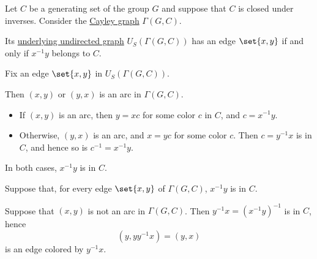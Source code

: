\begin{proposition}\label{thm:undirected_cayley_graph}
  Let \( C \) be a generating set of the group \( G \) and suppose that \( C \) is closed under inverses. Consider the \hyperref[def:cayley_graph]{Cayley graph} \( \Gamma(G, C) \).

  Its \hyperref[def:multigraph_orientation]{underlying undirected graph} \hyperref[def:graph_functors/simple_forgetful]{\( U_S \)}\( (\Gamma(G, C)) \) has an edge \( \set{ x, y } \) if and only if \( x^{-1} y \) belongs to \( C \).
\end{proposition}
\begin{defproof}
  \SufficiencySubProof Fix an edge \( \set{ x, y } \) in \( U_S(\Gamma(G, C)) \).

  Then \( (x, y) \) or \( (y, x) \) is an arc in \( \Gamma(G, C) \).

  \begin{itemize}
    \item If \( (x, y) \) is an arc, then \( y = xc \) for some color \( c \) in \( C \), and \( c = x^{-1} y \).
    \item Otherwise, \( (y, x) \) is an arc, and \( x = yc \) for some color \( c \). Then \( c = y^{-1} x \) is in \( C \), and hence so is \( c^{-1} = x^{-1} y \).
  \end{itemize}

  In both cases, \( x^{-1} y \) is in \( C \).

  \NecessitySubProof Suppose that, for every edge \( \set{ x, y } \) of \( \Gamma(G, C) \), \( x^{-1} y \) is in \( C \).

  Suppose that \( (x, y) \) is not an arc in \( \Gamma(G, C) \). Then \( y^{-1} x = (x^{-1} y)^{-1} \) is in \( C \), hence
  \begin{equation*}
    (y, y y^{-1} x) = (y, x)
  \end{equation*}
  is an edge colored by \( y^{-1} x \).
\end{defproof}

